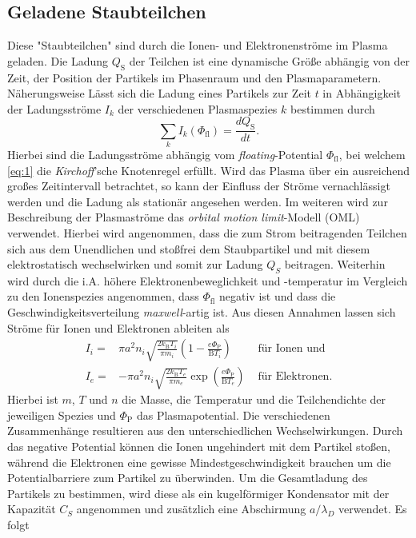 \documentclass[numbers=noenddot,a4paper,notitlepage,twoside,BCOR15mm]{scrartcl}
\begin{document}
	\subsection{Geladene Staubteilchen}
		 Diese {}"Staubteilchen{}" sind durch die Ionen- und Elektronenströme im Plasma geladen. Die Ladung $Q_\mathrm{S}$ der Teilchen ist eine dynamische Größe abhängig von der Zeit, der Position der Partikels im Phasenraum und den Plasmaparametern. Näherungsweise Lässt sich die Ladung eines Partikels zur Zeit $t$ in Abhängigkeit der Ladungsströme $I_k$ der verschiedenen Plasmaspezies $k$ bestimmen durch
		\begin{equation}
		\label{eq:1}
			\sum_{k} I_k(\Phi_\mathrm{fl})=\frac{dQ_\mathrm{S}}{dt}.
		\end{equation}
		Hierbei sind die Ladungsströme abhängig vom \textit{floating}-Potential $\Phi_\mathrm{fl}$, bei welchem \autoref{eq:1} die \textit{Kirchoff}'sche Knotenregel erfüllt. Wird das Plasma über ein ausreichend großes Zeitintervall betrachtet, so kann der Einfluss der Ströme vernachlässigt werden und die Ladung als stationär angesehen werden. Im weiteren wird zur Beschreibung der Plasmaströme das \textit{orbital motion limit}-Modell (OML) verwendet. Hierbei wird angenommen, dass die zum Strom beitragenden Teilchen sich aus dem Unendlichen und stoßfrei dem Staubpartikel und mit diesem elektrostatisch wechselwirken und somit zur Ladung $Q_S$ beitragen. Weiterhin wird durch die i.A. höhere Elektronenbeweglichkeit und -temperatur im Vergleich zu den Ionenspezies angenommen, dass $\Phi_\mathrm{fl}$ negativ ist und dass die Geschwindigkeitsverteilung \textit{maxwell}-artig ist.
		Aus diesen Annahmen lassen sich Ströme für Ionen und Elektronen ableiten als
		\begin{align}
			I_i =& \pi a^2 n_i \sqrt{\frac{2k_\mathrm{B}T_i}{\pi m_i}}\left(1-\frac{e\Phi_\mathrm{P}}{\mathrm{B}T_i}\right)\,\,&\text{für Ionen und} \\
			I_e =& - \pi a^2 n_i \sqrt{\frac{2k_\mathrm{B}T_e}{\pi m_e}}\exp\left(\frac{e\Phi_\mathrm{P}}{\mathrm{B}T_e}\right)\,\,&\text{für Elektronen.}
		\end{align}
		Hierbei ist $m$, $T$ und $n$ die Masse, die Temperatur und die Teilchendichte der jeweiligen Spezies und $\Phi_\mathrm{P}$ das Plasmapotential. Die verschiedenen Zusammenhänge resultieren aus den unterschiedlichen Wechselwirkungen. Durch das negative Potential können die Ionen ungehindert mit dem Partikel stoßen, während die Elektronen eine gewisse Mindestgeschwindigkeit brauchen um die Potentialbarriere zum Partikel zu überwinden. Um die Gesamtladung des Partikels zu bestimmen, wird diese als ein kugelförmiger Kondensator mit der Kapazität $C_S$ angenommen und zusätzlich eine Abschirmung $a/\lambda_D$ verwendet. Es folgt
\end{document}
